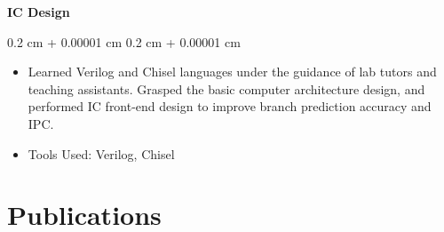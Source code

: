 \documentclass[10pt, letterpaper]{article}
\newenvironment{highlights}{
    \begin{itemize}[
        topsep=0.10 cm,
        parsep=0.10 cm,
        partopsep=0pt,
        itemsep=0pt,
        leftmargin=0.4 cm + 10pt
    ]
}{
    \end{itemize}
} %
\newenvironment{onecolentry}{
    \begin{adjustwidth}{
        0.2 cm + 0.00001 cm
    }{
        0.2 cm + 0.00001 cm
    }
}{
    \end{adjustwidth}
} %
\newenvironment{twocolentry}[2][]{
    \onecolentry
    \def\secondColumn{#2}
    \setcolumnwidth{\fill, 6 cm}
    \begin{paracol}{2}
}{
    \switchcolumn \raggedleft \secondColumn
    \end{paracol}
    \endonecolentry
} %
\let\hrefWithoutArrow\href
\renewcommand{\href}[2]{\hrefWithoutArrow{#1}{\ifthenelse{\equal{#2}{}}{ }{#2 }\raisebox{.15ex}{\footnotesize \faExternalLink*}}}
\begin{document}
    \vspace{0.2 cm}

            \textbf{IC Design}

        \vspace{0.10 cm}
        \begin{onecolentry}
            \begin{highlights}
                \item Learned Verilog and Chisel languages under the guidance of lab tutors and teaching assistants.
                Grasped the basic computer architecture design, and performed IC front-end design to improve branch prediction
                accuracy and IPC.
                \item Tools Used: Verilog, Chisel
            \end{highlights}
        \end{onecolentry}


        \vspace{0.2 cm}

    \section{Publications}
\end{document}
